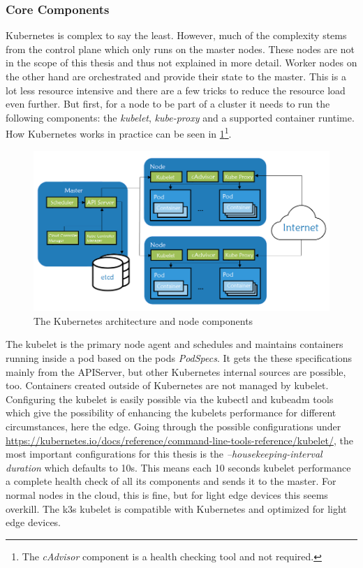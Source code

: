 \subsubsection{Core Components}
Kubernetes is complex to say the least. However, much of the complexity stems from the control plane which only runs on the master nodes. These nodes are not in the scope of this thesis and thus not explained in more detail. Worker nodes on the other hand are orchestrated and provide their state to the master. This is a lot less resource intensive and there are a few tricks to reduce the resource load even further. But first, for a node to be part of a cluster it needs to run the following components: the \textit{kubelet}, \textit{kube-proxy} and a supported container runtime. How Kubernetes works in practice can be seen in \cref{fig:nodeComponents}\footnote{The \textit{cAdvisor} component is a health checking tool and not required.}.
\begin{figure}[h!]
    \centering
    \includegraphics[scale=0.6]{figures/rancherK8sComponents.png}
    \caption{The Kubernetes architecture and node components\cite{nodeSetupKubernetes:online}}
    \label{fig:nodeComponents}
\end{figure}
The kubelet is the primary node agent and schedules and maintains containers running inside a pod based on the pods \textit{PodSpecs}. It gets the these specifications mainly from the APIServer, but other Kubernetes internal sources are possible, too. Containers created outside of Kubernetes are not managed by kubelet. Configuring the kubelet is easily possible via the kubectl and kubeadm tools which give the possibility of enhancing the kubelets performance for different circumstances, here the edge. Going through the possible configurations under \url{https://kubernetes.io/docs/reference/command-line-tools-reference/kubelet/}, the most important configurations for this thesis is the \textit{--housekeeping-interval duration} which defaults to 10s\cite{rancherKubernetesComponents:online}. This means each 10 seconds kubelet performance a complete health check of all its components and sends it to the master. For normal nodes in the cloud, this is fine, but for light edge devices this seems overkill. The k3s kubelet is compatible with Kubernetes and optimized for light edge devices.\\
